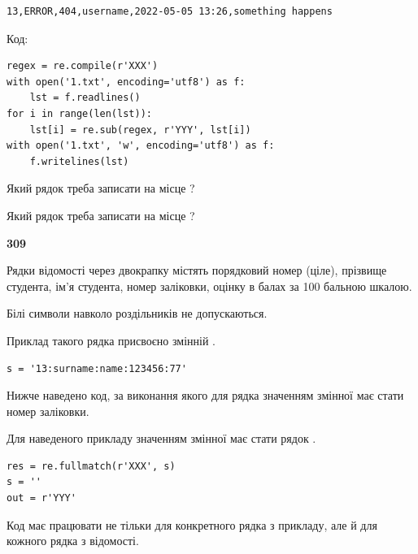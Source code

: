 \begin{verbatim}
13,ERROR,404,username,2022-05-05 13:26,something happens
\end{verbatim}




Код:



\begin{verbatim}
regex = re.compile(r'XXX')
with open('1.txt', encoding='utf8') as f:
    lst = f.readlines()
for i in range(len(lst)):
    lst[i] = re.sub(regex, r'YYY', lst[i])
with open('1.txt', 'w', encoding='utf8') as f:
    f.writelines(lst)
\end{verbatim}







Який рядок треба записати на місце  ?\par
\vspace{5mm}


Який рядок треба записати на місце  ?\par


\newpage

{\begin {center}\textbf{ 309}\end {center}}\par
Рядки відомості через двокрапку містять порядковий номер (ціле), пріз\-ви\-ще студен\-та, ім'я студента, номер заліковки, оцінку в балах за 100 бальною шкалою.

Білі символи навколо роздільників не допускаються.

Приклад такого рядка присвоєно змінній .



\begin{verbatim}
s = '13:surname:name:123456:77'
\end{verbatim}


Нижче наведено код, за виконання якого для рядка  значенням змінної  має стати номер заліковки.

Для наведеного прикладу значенням змінної  має стати рядок  .



\begin{verbatim}
res = re.fullmatch(r'XXX', s)
s = ''
out = r'YYY'
\end{verbatim}


Код має працювати не тільки для конкретного рядка з прикладу, але й для кожного рядка з відомості.




